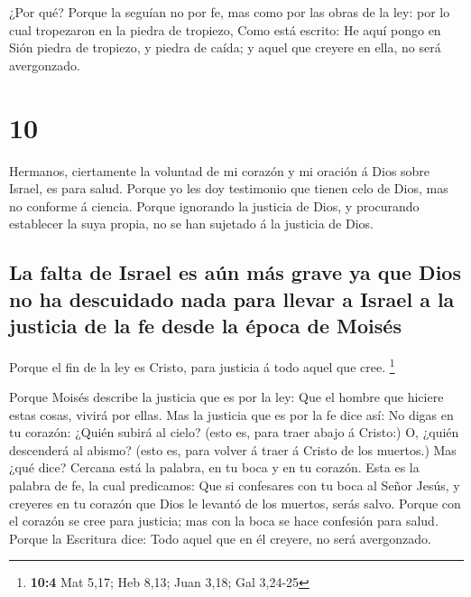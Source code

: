  ¿Por qué? Porque la seguían no por fe, mas como por las
obras de la ley: por lo cual tropezaron en la piedra de tropiezo,
 Como está escrito: He aquí pongo en Sión piedra de
tropiezo, y piedra de caída; y aquel que creyere en ella, no será
avergonzado.

\hypertarget{section-9}{%
\section{10}\label{section-9}}

 Hermanos, ciertamente la voluntad de mi corazón y mi
oración á Dios sobre Israel, es para salud.  Porque yo les
doy testimonio que tienen celo de Dios, mas no conforme á ciencia.
 Porque ignorando la justicia de Dios, y procurando
establecer la suya propia, no se han sujetado á la justicia de Dios.

\hypertarget{la-falta-de-israel-es-auxfan-muxe1s-grave-ya-que-dios-no-ha-descuidado-nada-para-llevar-a-israel-a-la-justicia-de-la-fe-desde-la-uxe9poca-de-moisuxe9s}{%
\subsection{La falta de Israel es aún más grave ya que Dios no ha
descuidado nada para llevar a Israel a la justicia de la fe desde la
época de
Moisés}\label{la-falta-de-israel-es-auxfan-muxe1s-grave-ya-que-dios-no-ha-descuidado-nada-para-llevar-a-israel-a-la-justicia-de-la-fe-desde-la-uxe9poca-de-moisuxe9s}}

 Porque el fin de la ley es Cristo, para justicia á todo
aquel que cree. \footnote{\textbf{10:4} Mat 5,17; Heb 8,13; Juan 3,18;
  Gal 3,24-25}

 Porque Moisés describe la justicia que es por la ley: Que
el hombre que hiciere estas cosas, vivirá por ellas.  Mas la
justicia que es por la fe dice así: No digas en tu corazón: ¿Quién
subirá al cielo? (esto es, para traer abajo á Cristo:)  O,
¿quién descenderá al abismo? (esto es, para volver á traer á Cristo de
los muertos.)  Mas ¿qué dice? Cercana está la palabra, en tu
boca y en tu corazón. Esta es la palabra de fe, la cual predicamos:
 Que si confesares con tu boca al Señor Jesús, y creyeres en
tu corazón que Dios le levantó de los muertos, serás salvo.
 Porque con el corazón se cree para justicia; mas con la
boca se hace confesión para salud.  Porque la Escritura
dice: Todo aquel que en él creyere, no será avergonzado.

